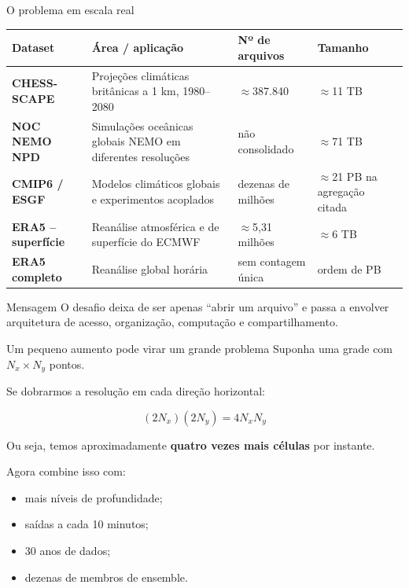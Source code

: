 \documentclass[aspectratio=169]{beamer}
\begin{document}
\begin{frame}{O problema em escala real}
\scriptsize
\begin{table}
\centering
\renewcommand{\arraystretch}{1.10}
\begin{tabular}{>{\bfseries}p{} p{} p{} p{}}
\toprule
Dataset & Área / aplicação & Nº de arquivos & Tamanho \\
\midrule
CHESS-SCAPE & Projeções climáticas britânicas a 1 km, 1980--2080 & $\approx$387.840 & $\approx$11 TB \\
NOC NEMO NPD & Simulações oceânicas globais NEMO em diferentes resoluções & não consolidado & $\approx$71 TB \\
CMIP6 / ESGF & Modelos climáticos globais e experimentos acoplados & dezenas de milhões & $\approx$21 PB na agregação citada \\
ERA5 -- superfície & Reanálise atmosférica e de superfície do ECMWF & $\approx$5,31 milhões & $\approx$6 TB \\
ERA5 completo & Reanálise global horária & sem contagem única & ordem de PB \\
\bottomrule
\end{tabular}
\end{table}

\vspace{0.25cm}
\begin{block}{Mensagem}
O desafio deixa de ser apenas ``abrir um arquivo'' e passa a envolver arquitetura de acesso, organização, computação e compartilhamento.
\end{block}
\end{frame}


\begin{frame}{Um pequeno aumento pode virar um grande problema}
Suponha uma grade com $N_x \times N_y$ pontos.

\vspace{0.4cm}

Se dobrarmos a resolução em cada direção horizontal:

\[
(2N_x)(2N_y) = 4N_xN_y
\]

\vspace{0.3cm}

Ou seja, temos aproximadamente \textbf{quatro vezes mais células} por instante.

\vspace{0.4cm}

Agora combine isso com:

\begin{itemize}
  \item mais níveis de profundidade;
  \item saídas a cada 10 minutos;
  \item 30 anos de dados;
  \item dezenas de membros de ensemble.
\end{itemize}
\end{frame}
\end{document}
